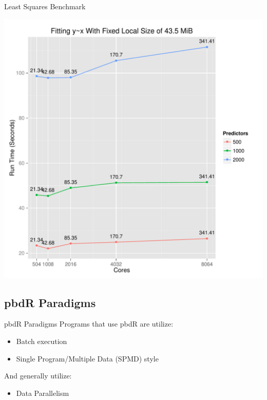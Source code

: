 \begin{frame}
  \begin{block}{Least Squares Benchmark}\pause
  \begin{center}
  \includegraphics[height=.89\textheight]{pics/lmfit_bench}
  \end{center}
  \end{block}
\end{frame}



\subsection{pbdR Paradigms}

\begin{frame}
  \begin{block}{pbdR Paradigms}
  Programs that use pbdR are utilize:
  \begin{itemize}[<+-|alert@+>]
   \item Batch execution
   \item Single Program/Multiple Data (SPMD) style
   \\[.2cm]
   \end{itemize}
    And generally utilize:
   \begin{itemize}
   \item Data Parallelism
  \end{itemize}
  \end{block}
\end{frame}


